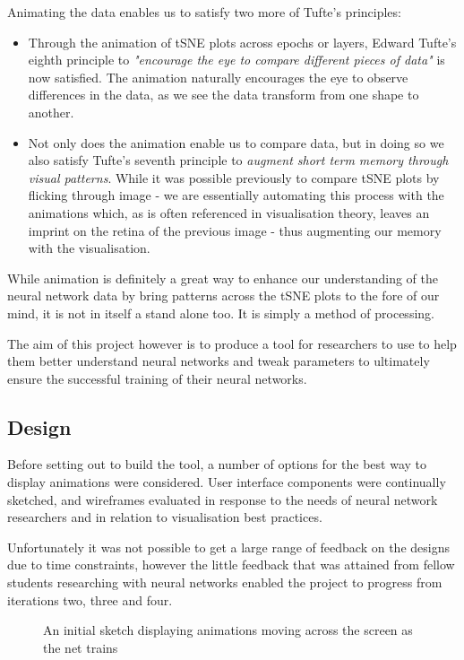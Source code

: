 \documentclass[a4paper,11pt,titlepage]{article}
\begin{document}
	Animating the data enables us to satisfy two more of Tufte's principles:
	\begin{itemize}
		\item Through the animation of tSNE plots across epochs or layers, Edward Tufte's eighth principle to \textit{"encourage the eye to compare different pieces of data"} is now satisfied. The animation naturally encourages the eye to observe differences in the data, as we see the data transform from one shape to another. 
		\item Not only does the animation enable us to compare data, but in doing so we also satisfy Tufte's seventh principle to \textit{augment short term memory through visual patterns}. While it was possible previously to compare tSNE plots by flicking through image - we are essentially automating this process with the animations which, as is often referenced in visualisation theory, leaves an imprint on the retina of the previous image - thus augmenting our memory with the visualisation. 
	\end{itemize}
	
	While animation is definitely a great way to enhance our understanding of the neural network data by bring patterns across the tSNE plots to the fore of our mind, it is not in itself a stand alone too. It is simply a method of processing. 
	\par 
	The aim of this project however is to produce a tool for researchers to use to help them better understand neural networks and tweak parameters to ultimately ensure the successful training of their neural networks.
	\par 
	
	\subsection{Design}
	Before setting out to build the tool, a number of options for the best way to display animations were considered. User interface components were continually sketched, and wireframes evaluated in response to the needs of neural network researchers and in relation to visualisation best practices. 
	\par 
	Unfortunately it was not possible to get a large range of feedback on the designs due to time constraints, however the little feedback that was attained from fellow students researching with neural networks enabled the project to progress from iterations two, three and four. 
	
	\begin{figure}[H]
    			\caption{An initial sketch displaying animations moving across the screen as the net trains}%
	\end{figure}		
	
\end{document}
